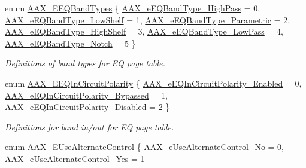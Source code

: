 \begin{DoxyCompactItemize}
enum \mbox{\hyperlink{a00491_a9ec6da28e827496514bd15d6f2b26d95}{A\+A\+X\+\_\+\+E\+E\+Q\+Band\+Types}} \{ \newline
\mbox{\hyperlink{a00491_a9ec6da28e827496514bd15d6f2b26d95a7827eec27ad12a8abb7f466c629b6482}{A\+A\+X\+\_\+e\+E\+Q\+Band\+Type\+\_\+\+High\+Pass}} = 0, 
\mbox{\hyperlink{a00491_a9ec6da28e827496514bd15d6f2b26d95a3dbff637a879e2f187f9ad1bbb97c8a3}{A\+A\+X\+\_\+e\+E\+Q\+Band\+Type\+\_\+\+Low\+Shelf}} = 1, 
\mbox{\hyperlink{a00491_a9ec6da28e827496514bd15d6f2b26d95a162d60d2812f3786ef5f87d288193e95}{A\+A\+X\+\_\+e\+E\+Q\+Band\+Type\+\_\+\+Parametric}} = 2, 
\mbox{\hyperlink{a00491_a9ec6da28e827496514bd15d6f2b26d95aa36c45b5f1a3dd677fdb14020b83d16f}{A\+A\+X\+\_\+e\+E\+Q\+Band\+Type\+\_\+\+High\+Shelf}} = 3, 
\newline
\mbox{\hyperlink{a00491_a9ec6da28e827496514bd15d6f2b26d95a5de1272a9829d9d764a7a25adcdae1eb}{A\+A\+X\+\_\+e\+E\+Q\+Band\+Type\+\_\+\+Low\+Pass}} = 4, 
\mbox{\hyperlink{a00491_a9ec6da28e827496514bd15d6f2b26d95a5e8aee84ee2cd1db292283e7550e64dc}{A\+A\+X\+\_\+e\+E\+Q\+Band\+Type\+\_\+\+Notch}} = 5
 \}
\begin{DoxyCompactList}\small\item\em Definitions of band types for EQ page table. \end{DoxyCompactList}\item 
enum \mbox{\hyperlink{a00491_ab5bda96f09874705e9b800d1b1495b48}{A\+A\+X\+\_\+\+E\+E\+Q\+In\+Circuit\+Polarity}} \{ \mbox{\hyperlink{a00491_ab5bda96f09874705e9b800d1b1495b48aa1f21f2aa320ece14a9259195d3ee2bd}{A\+A\+X\+\_\+e\+E\+Q\+In\+Circuit\+Polarity\+\_\+\+Enabled}} = 0, 
\mbox{\hyperlink{a00491_ab5bda96f09874705e9b800d1b1495b48aeef37a6376396f07977b4c233985dfe6}{A\+A\+X\+\_\+e\+E\+Q\+In\+Circuit\+Polarity\+\_\+\+Bypassed}} = 1, 
\mbox{\hyperlink{a00491_ab5bda96f09874705e9b800d1b1495b48a4a85b608d03de4997616de1e95610208}{A\+A\+X\+\_\+e\+E\+Q\+In\+Circuit\+Polarity\+\_\+\+Disabled}} = 2
 \}
\begin{DoxyCompactList}\small\item\em Definitions for band in/out for EQ page table. \end{DoxyCompactList}\item 
enum \mbox{\hyperlink{a00491_abbcc8b4e8207262a5dd9e32047a51a29}{A\+A\+X\+\_\+\+E\+Use\+Alternate\+Control}} \{ \mbox{\hyperlink{a00491_abbcc8b4e8207262a5dd9e32047a51a29a5cfea068cc7ea51becccc9d26955e443}{A\+A\+X\+\_\+e\+Use\+Alternate\+Control\+\_\+\+No}} = 0, 
\mbox{\hyperlink{a00491_abbcc8b4e8207262a5dd9e32047a51a29aa63097dc0b27e51411f30b06b2db26f1}{A\+A\+X\+\_\+e\+Use\+Alternate\+Control\+\_\+\+Yes}} = 1

\end{DoxyCompactItemize}
